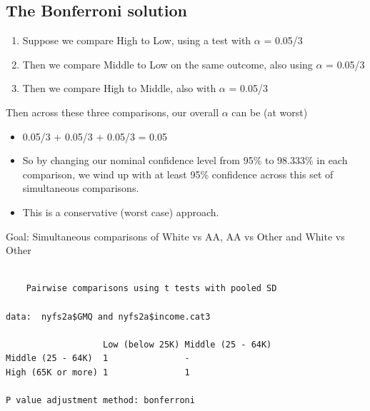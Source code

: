 \documentclass[
]{book}
\newenvironment{Shaded}{\begin{snugshade}}{\end{snugshade}}
\newcommand{\DataTypeTok}[1]{\textcolor[rgb]{0.13,0.29,0.53}{#1}}
\newcommand{\KeywordTok}[1]{\textcolor[rgb]{0.13,0.29,0.53}{\textbf{#1}}}
\newcommand{\NormalTok}[1]{#1}
\newcommand{\OperatorTok}[1]{\textcolor[rgb]{0.81,0.36,0.00}{\textbf{#1}}}
\newcommand{\StringTok}[1]{\textcolor[rgb]{0.31,0.60,0.02}{#1}}
\providecommand{\tightlist}{%
  \setlength{\itemsep}{0pt}\setlength{\parskip}{0pt}}
\begin{document}
\hypertarget{the-bonferroni-solution}{%
\subsection{The Bonferroni solution}\label{the-bonferroni-solution}}

\begin{enumerate}
\def\labelenumi{\arabic{enumi}.}
\tightlist
\item
  Suppose we compare High to Low, using a test with \(\alpha\) = 0.05/3
\item
  Then we compare Middle to Low on the same outcome, also using \(\alpha\) = 0.05/3
\item
  Then we compare High to Middle, also with \(\alpha\) = 0.05/3
\end{enumerate}

Then across these three comparisons, our overall \(\alpha\) can be (at worst)

\begin{itemize}
\tightlist
\item
  0.05/3 + 0.05/3 + 0.05/3 = 0.05
\item
  So by changing our nominal confidence level from 95\% to 98.333\% in each comparison, we wind up with at least 95\% confidence across this set of simultaneous comparisons.
\item
  This is a conservative (worst case) approach.
\end{itemize}

Goal: Simultaneous comparisons of White vs AA, AA vs Other and White vs Other

\begin{Shaded}
\end{Shaded}

\begin{verbatim}

	Pairwise comparisons using t tests with pooled SD 

data:  nyfs2a$GMQ and nyfs2a$income.cat3 

                   Low (below 25K) Middle (25 - 64K)
Middle (25 - 64K)  1               -                
High (65K or more) 1               1                

P value adjustment method: bonferroni 
\end{verbatim}
\end{document}
